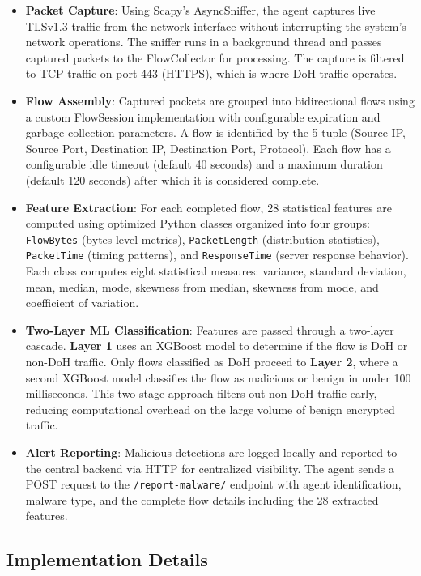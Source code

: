 \documentclass[../Main.tex]{subfiles}
\begin{document}
\begin{itemize}
    \item \textbf{Packet Capture}: Using Scapy's AsyncSniffer, the agent captures live TLSv1.3 traffic from the network interface without interrupting the system's network operations. The sniffer runs in a background thread and passes captured packets to the FlowCollector for processing. The capture is filtered to TCP traffic on port 443 (HTTPS), which is where DoH traffic operates.
    \item \textbf{Flow Assembly}: Captured packets are grouped into bidirectional flows using a custom FlowSession implementation with configurable expiration and garbage collection parameters. A flow is identified by the 5-tuple (Source IP, Source Port, Destination IP, Destination Port, Protocol). Each flow has a configurable idle timeout (default 40 seconds) and a maximum duration (default 120 seconds) after which it is considered complete.
    \item \textbf{Feature Extraction}: For each completed flow, 28 statistical features are computed using optimized Python classes organized into four groups: \texttt{FlowBytes} (bytes-level metrics), \texttt{PacketLength} (distribution statistics), \texttt{PacketTime} (timing patterns), and \texttt{ResponseTime} (server response behavior). Each class computes eight statistical measures: variance, standard deviation, mean, median, mode, skewness from median, skewness from mode, and coefficient of variation.
    \item \textbf{Two-Layer ML Classification}: Features are passed through a two-layer cascade. \textbf{Layer 1} uses an XGBoost model to determine if the flow is DoH or non-DoH traffic. Only flows classified as DoH proceed to \textbf{Layer 2}, where a second XGBoost model classifies the flow as malicious or benign in under 100 milliseconds. This two-stage approach filters out non-DoH traffic early, reducing computational overhead on the large volume of benign encrypted traffic.
    \item \textbf{Alert Reporting}: Malicious detections are logged locally and reported to the central backend via HTTP for centralized visibility. The agent sends a POST request to the \texttt{/report-malware/} endpoint with agent identification, malware type, and the complete flow details including the 28 extracted features.
\end{itemize}

\subsection{Implementation Details}
\end{document}
